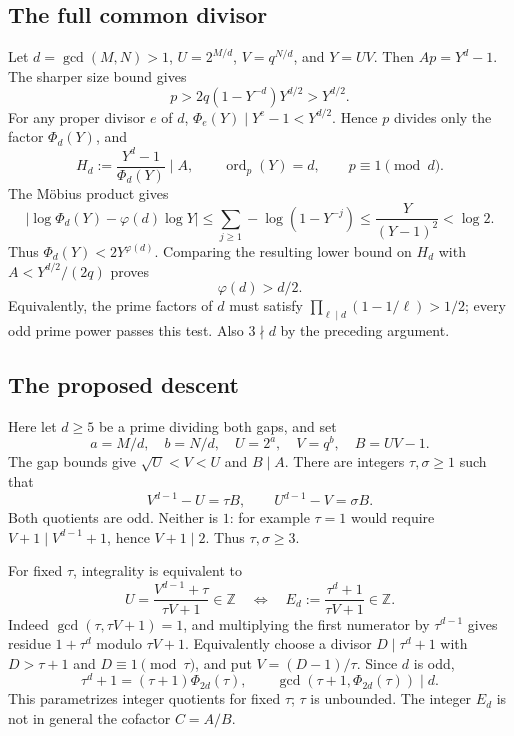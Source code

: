 \documentclass[11pt]{article}
\begin{document}
\subsection{The full common divisor}
\label{sec:full-gcd}
Let $d=\gcd(M,N)>1$, $U=2^{M/d}$, $V=q^{N/d}$, and $Y=UV$.
Then $Ap=Y^d-1$. The sharper size bound gives
\[
p>2q(1-Y^{-d})Y^{d/2}>Y^{d/2}.
\]
For any proper divisor $e$ of $d$, $\Phi_e(Y)\mid Y^e-1<Y^{d/2}$.
Hence $p$ divides only the factor $\Phi_d(Y)$, and
\[
H_d:=\frac{Y^d-1}{\Phi_d(Y)}\mid A,\qquad
\operatorname{ord}_p(Y)=d,\qquad p\equiv1\pmod d.
\]
The M\"obius product gives
\[
\left|\log\Phi_d(Y)-\varphi(d)\log Y\right|
\leq\sum_{j\geq1}-\log(1-Y^{-j})
\leq\frac{Y}{(Y-1)^2}<\log2.
\]
Thus $\Phi_d(Y)<2Y^{\varphi(d)}$. Comparing the resulting lower bound
on $H_d$ with $A<Y^{d/2}/(2q)$ proves
\[
\boxed{\varphi(d)>d/2.}
\]
Equivalently, the prime factors of $d$ must satisfy
$\prod_{\ell\mid d}(1-1/\ell)>1/2$; every odd prime power passes this test.
Also $3\nmid d$ by the preceding argument.

\subsection{The proposed descent}
\label{sec:descent}
Here let $d\geq5$ be a prime dividing both gaps, and set
\[
a=M/d,\quad b=N/d,\quad U=2^a,\quad V=q^b,\quad B=UV-1.
\]
The gap bounds give $\sqrt U<V<U$ and $B\mid A$.
There are integers $\tau,\sigma\geq1$ such that
\begin{equation}\label{eq:quotient-pair}
V^{d-1}-U=\tau B,\qquad U^{d-1}-V=\sigma B.
\end{equation}
Both quotients are odd. Neither is $1$: for example $\tau=1$ would
require $V+1\mid V^{d-1}+1$, hence $V+1\mid2$.
Thus $\tau,\sigma\geq3$.

For fixed $\tau$, integrality is equivalent to
\begin{equation}\label{eq:quotient-divisor}
U=\frac{V^{d-1}+\tau}{\tau V+1}\in\mathbb Z
\quad\Longleftrightarrow\quad
E_d:=\frac{\tau^d+1}{\tau V+1}\in\mathbb Z.
\end{equation}
Indeed $\gcd(\tau,\tau V+1)=1$, and multiplying the first numerator
by $\tau^{d-1}$ gives residue $1+\tau^d$ modulo $\tau V+1$.
Equivalently choose a divisor $D\mid\tau^d+1$ with
$D>\tau+1$ and $D\equiv1\pmod\tau$, and put $V=(D-1)/\tau$.
Since $d$ is odd,
\[
\tau^d+1=(\tau+1)\Phi_{2d}(\tau),\qquad
\gcd(\tau+1,\Phi_{2d}(\tau))\mid d.
\]
This parametrizes integer quotients for fixed $\tau$; $\tau$ is unbounded.
The integer $E_d$ is not in general the cofactor $C=A/B$.
\end{document}
